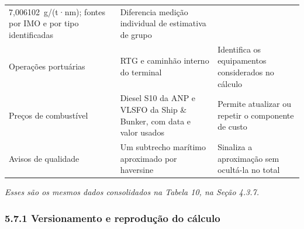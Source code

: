 \documentclass[brazil,]{article}
\let\oldsubsubsection\subsubsection
\renewcommand{\subsubsection}{\Needspace{10\baselineskip}\oldsubsubsection}
\begin{document}
\begin{longtable}[]{@{}lll@{}}
\begin{minipage}[t]{0.30\columnwidth}
7,006102~g/(t·nm); fontes por IMO e por tipo identificadas\strut
\end{minipage} & \begin{minipage}[t]{0.30\columnwidth}\raggedright
Diferencia medição individual de estimativa de grupo\strut
\end{minipage}\tabularnewline
\begin{minipage}[t]{0.30\columnwidth}\raggedright
Operações portuárias\strut
\end{minipage} & \begin{minipage}[t]{0.30\columnwidth}\raggedright
RTG e caminhão interno do terminal\strut
\end{minipage} & \begin{minipage}[t]{0.30\columnwidth}\raggedright
Identifica os equipamentos considerados no cálculo\strut
\end{minipage}\tabularnewline
\begin{minipage}[t]{0.30\columnwidth}\raggedright
Preços de combustível\strut
\end{minipage} & \begin{minipage}[t]{0.30\columnwidth}\raggedright
Diesel S10 da ANP e VLSFO da Ship \& Bunker, com data e valor
usados\strut
\end{minipage} & \begin{minipage}[t]{0.30\columnwidth}\raggedright
Permite atualizar ou repetir o componente de custo\strut
\end{minipage}\tabularnewline
\begin{minipage}[t]{0.30\columnwidth}\raggedright
Avisos de qualidade\strut
\end{minipage} & \begin{minipage}[t]{0.30\columnwidth}\raggedright
Um subtrecho marítimo aproximado por haversine\strut
\end{minipage} & \begin{minipage}[t]{0.30\columnwidth}\raggedright
Sinaliza a aproximação sem ocultá-la no total\strut
\end{minipage}\tabularnewline
\bottomrule
\end{longtable}

\emph{Esses são os mesmos dados consolidados na Tabela 10, na Seção
4.3.7.}

\hypertarget{versionamento-e-reproduuxe7uxe3o-do-cuxe1lculo}{%
\subsubsection{5.7.1 Versionamento e reprodução do
cálculo}\label{versionamento-e-reproduuxe7uxe3o-do-cuxe1lculo}}
\end{document}
